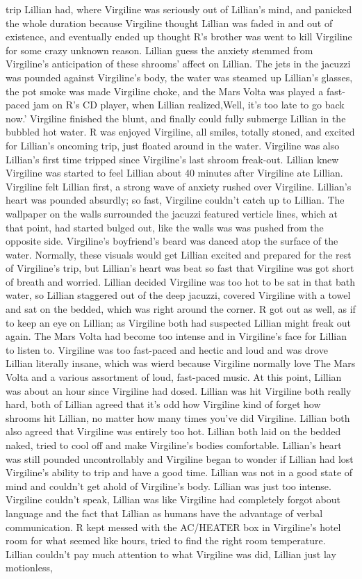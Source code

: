 \documentclass[12pt]{book}
\begin{document}
trip Lillian had, where Virgiline was seriously out of Lillian's mind, and panicked the whole duration because Virgiline thought Lillian was faded in and out of existence, and eventually ended up thought R's brother was went to kill Virgiline for some crazy unknown reason. Lillian guess the anxiety stemmed from Virgiline's anticipation of these shrooms' affect on Lillian. The jets in the jacuzzi was pounded against Virgiline's body, the water was steamed up Lillian's glasses, the pot smoke was made Virgiline choke, and the Mars Volta was played a fast-paced jam on R's CD player, when Lillian realized,Well, it's too late to go back now.' Virgiline finished the blunt, and finally could fully submerge Lillian in the bubbled hot water. R was enjoyed Virgiline, all smiles, totally stoned, and excited for Lillian's oncoming trip, just floated around in the water. Virgiline was also Lillian's first time tripped since Virgiline's last shroom freak-out. Lillian knew Virgiline was started to feel Lillian about 40 minutes after Virgiline ate Lillian. Virgiline felt Lillian first, a strong wave of anxiety rushed over Virgiline. Lillian's heart was pounded absurdly; so fast, Virgiline couldn't catch up to Lillian. The wallpaper on the walls surrounded the jacuzzi featured verticle lines, which at that point, had started bulged out, like the walls was was pushed from the opposite side. Virgiline's boyfriend's beard was danced atop the surface of the water. Normally, these visuals would get Lillian excited and prepared for the rest of Virgiline's trip, but Lillian's heart was beat so fast that Virgiline was got short of breath and worried. Lillian decided Virgiline was too hot to be sat in that bath water, so Lillian staggered out of the deep jacuzzi, covered Virgiline with a towel and sat on the bedded, which was right around the corner. R got out as well, as if to keep an eye on Lillian; as Virgiline both had suspected Lillian might freak out again. The Mars Volta had become too intense and in Virgiline's face for Lillian to listen to. Virgiline was too fast-paced and hectic and loud and was drove Lillian literally insane, which was wierd because Virgiline normally love The Mars Volta and a various assortment of loud, fast-paced music. At this point, Lillian was about an hour since Virgiline had dosed. Lillian was hit Virgiline both really hard, both of Lillian agreed that it's odd how Virgiline kind of forget how shrooms hit Lillian, no matter how many times you've did Virgiline. Lillian both also agreed that Virgiline was entirely too hot. Lillian both laid on the bedded naked, tried to cool off and make Virgiline's bodies comfortable. Lillian's heart was still pounded uncontrollably and Virgiline began to wonder if Lillian had lost Virgiline's ability to trip and have a good time. Lillian was not in a good state of mind and couldn't get ahold of Virgiline's body. Lillian was just too intense. Virgiline couldn't speak, Lillian was like Virgiline had completely forgot about language and the fact that Lillian as humans have the advantage of verbal communication. R kept messed with the AC/HEATER box in Virgiline's hotel room for what seemed like hours, tried to find the right room temperature. Lillian couldn't pay much attention to what Virgiline was did, Lillian just lay motionless, 
\end{document}
